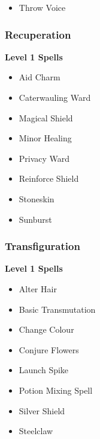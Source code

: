 \begin{multicols}{4}
\begin{itemize}[itemsep=0em]
\item Throw Voice


\end{itemize}
\subsubsection{Recuperation}
\textbf{Level 1 Spells}
\begin{itemize}[itemsep=0em]
\renewcommand\labelitemi{-}
\item Aid Charm

\item Caterwauling Ward

\item Magical Shield

\item Minor Healing

\item Privacy Ward

\item Reinforce Shield

\item Stoneskin

\item Sunburst


\end{itemize}
\vfill\null
\columnbreak\subsubsection{Transfiguration}
\textbf{Level 1 Spells}
\begin{itemize}[itemsep=0em]
\renewcommand\labelitemi{-}
\item Alter Hair

\item Basic Transmutation

\item Change Colour

\item Conjure Flowers

\item Launch Spike

\item Potion Mixing Spell

\item Silver Shield

\item Steelclaw



\end{itemize}
\end{multicols}
